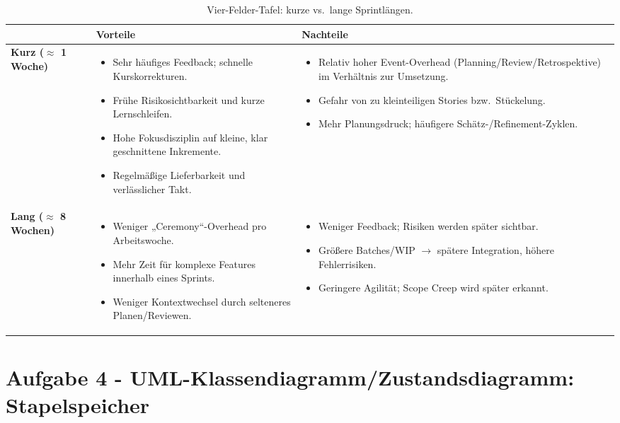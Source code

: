 \documentclass[12pt]{article}
\begin{document}
\begin{table}[h]
\centering
\renewcommand{\arraystretch}{1.15}
\begin{tabularx}{\textwidth}{@{} l X X @{}}
\toprule
& \textbf{Vorteile} & \textbf{Nachteile} \\
\midrule
\textbf{Kurz (\(\approx\) 1 Woche)} &
\begin{itemize}[leftmargin=*]
  \item Sehr häufiges Feedback; schnelle Kurskorrekturen.
  \item Frühe Risikosichtbarkeit und kurze Lernschleifen.
  \item Hohe Fokusdisziplin auf kleine, klar geschnittene Inkremente.
  \item Regelmäßige Lieferbarkeit und verlässlicher Takt.
\end{itemize}
&
\begin{itemize}[leftmargin=*]
  \item Relativ hoher Event-Overhead (Planning/Review/Retrospektive) im Verhältnis zur Umsetzung.
  \item Gefahr von zu kleinteiligen Stories bzw.\ Stückelung.
  \item Mehr Planungsdruck; häufigere Schätz-/Refinement-Zyklen.
\end{itemize}
\\
\midrule
\textbf{Lang (\(\approx\) 8 Wochen)} &
\begin{itemize}[leftmargin=*]
  \item Weniger „Ceremony“-Overhead pro Arbeitswoche.
  \item Mehr Zeit für komplexe Features innerhalb eines Sprints.
  \item Weniger Kontextwechsel durch selteneres Planen/Reviewen.
\end{itemize}
&
\begin{itemize}[leftmargin=*]
  \item Weniger Feedback; Risiken werden später sichtbar.
  \item Größere Batches/WIP $\rightarrow$ spätere Integration, höhere Fehlerrisiken.
  \item Geringere Agilität; Scope Creep wird später erkannt.
\end{itemize}
\\
\bottomrule
\end{tabularx}
\caption{Vier-Felder-Tafel: kurze vs.\ lange Sprintlängen.}
\end{table}

\section*{Aufgabe 4 - UML-Klassendiagramm/Zustandsdiagramm: Stapelspeicher}
\end{document}
